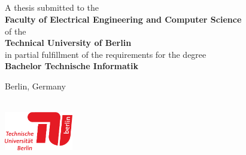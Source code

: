 \thispagestyle{empty}
\rule{0cm}{2cm}

\fontsize{19.83}{26.45} \selectfont 
\noindent \textbf{\titleLineOne} \vspace{0.2cm}
\\\textbf{\titleLineTwo}\vspace{0.2cm}
\\\textbf{\titleLineThree}
\normalsize



\newpage
\thispagestyle{empty}
\rule{0cm}{2cm}
\newpage

\thispagestyle{empty}
\rule{0cm}{1.5cm}

\fontsize{26.44}{32} \selectfont 
\noindent \textbf{\titleLineOne} \vspace{0.2cm}
\\\textbf{\titleLineTwo}\vspace{0.2cm}
\\\textbf{\titleLineThree}
\normalsize



\vspace{1.5cm}
 
\noindent \textbf{\studentname}

\vspace{-0.25cm}
\vspace{7cm}

\noindent A thesis submitted to the 
\\\textbf{Faculty of Electrical Engineering and Computer Science
} 
\\of the 
\\\textbf{Technical University of Berlin} 
\\in partial fulfillment of the requirements for the degree 
\\\textbf{Bachelor Technische Informatik}

\vspace{-0.5cm}
 
\noindent Berlin, Germany\\ 
\documentdate\\

\vspace{-0.83cm}

\noindent \includegraphics[width=30mm,angle=0]{graphics/tu_logo}

